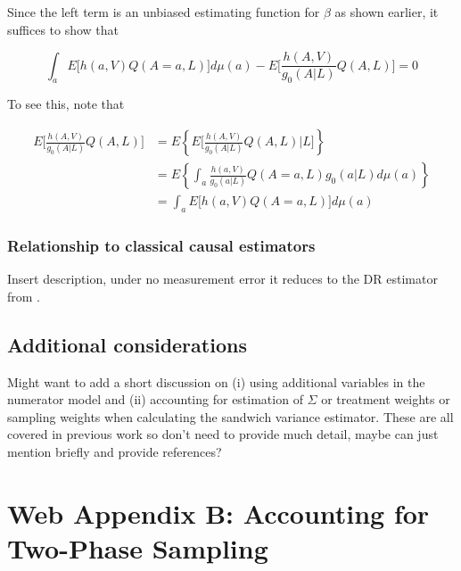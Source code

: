 \documentclass[12pt]{article}
\begin{document}
Since the left term is an unbiased estimating function for $\beta$ as shown earlier, it suffices to show that

\begin{equation*}
\int_{a} E \bigg[ h(a, V)Q(A = a, L) \bigg] d\mu (a) - E \bigg[\frac{h(A, V)}{g_{0}(A | L)}Q(A, L) \bigg] = 0
\end{equation*}

To see this, note that

\begin{align*}
E \bigg[\frac{h(A, V)}{g_{0}(A | L)}Q(A, L) \bigg] &= E \left \{ E \bigg[\frac{h(A, V)}{g_{0}(A | L)}Q(A, L) | L \bigg] \right \} \\
&= E \left \{ \int_{a} \frac{h(a, V)}{g_{0}(a | L)}Q(A = a, L) g_{0}(a | L) d\mu (a) \right \} \\
&= \int_{a} E \bigg[ h(a, V)Q(A = a, L) \bigg] d\mu (a)
\end{align*}

\subsubsection{Relationship to classical causal estimators}

Insert description, under no measurement error it reduces to the DR estimator from \citet{neugebauer2005}.

\subsection{Additional considerations}

Might want to add a short discussion on (i) using additional variables in the numerator model and (ii) accounting for estimation of $\Sigma$ or treatment weights or sampling weights when calculating the sandwich variance estimator. These are all covered in previous work so don't need to provide much detail, maybe can just mention briefly and provide references?

\section{Web Appendix B: Accounting for Two-Phase Sampling}
\end{document}
